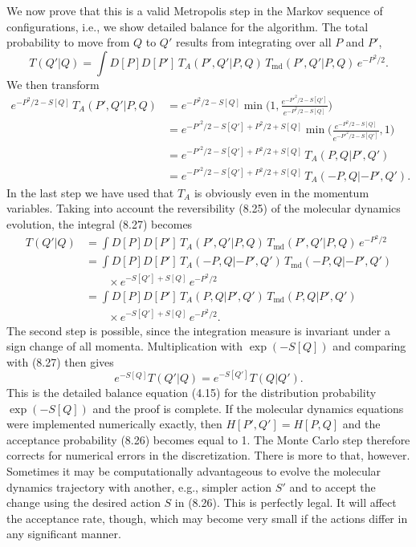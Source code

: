 We now prove that this is a valid Metropolis step in the Markov sequence of
configurations, i.e., we show detailed balance for the algorithm. The total
probability to move from $Q$ to $Q'$ results from integrating over all $P$ and
$P'$,
\begin{equation}
T(Q'|Q) = \int D[P]D[P']\,T_A(P',Q'|P,Q)\,T_{\mathrm{md}}(P',Q'|P,Q)\,e^{-P^2/2}.
\end{equation}
We then transform
\begin{equation}
\begin{split}
e^{-P^2/2-S[Q]}\,T_A(P',Q'|P,Q)
&= e^{-P^2/2-S[Q]}\min\!\Big(1,\frac{e^{-P'^2/2-S[Q']}}{e^{-P^2/2-S[Q]}}\Big)\\
&= e^{-P'^2/2-S[Q']+P^2/2+S[Q]}
   \min\!\Big(\frac{e^{-P^2/2-S[Q]}}{e^{-P'^2/2-S[Q']}},1\Big)\\
&= e^{-P'^2/2-S[Q']+P^2/2+S[Q]}\,T_A(P,Q|P',Q')\\
&= e^{-P'^2/2-S[Q']+P^2/2+S[Q]}\,T_A(-P,Q|-P',Q').
\end{split}
\end{equation}
In the last step we have used that $T_A$ is obviously even in the momentum
variables. Taking into account the reversibility (8.25) of the molecular
dynamics evolution, the integral (8.27) becomes
\begin{equation}
\begin{split}
T(Q'|Q) &= \int D[P]D[P']\,T_A(P',Q'|P,Q)\,T_{\mathrm{md}}(P',Q'|P,Q)\,e^{-P^2/2}\\
&= \int D[P]D[P']\,T_A(-P,Q|-P',Q')\,T_{\mathrm{md}}(-P,Q|-P',Q')\\
&\qquad \times e^{-S[Q']+S[Q]}\,e^{-P^2/2}\\
&= \int D[P]D[P']\,T_A(P,Q|P',Q')\,T_{\mathrm{md}}(P,Q|P',Q')\\
&\qquad \times e^{-S[Q']+S[Q]}\,e^{-P^2/2}.
\end{split}
\end{equation}
The second step is possible, since the integration measure is invariant under a
sign change of all momenta. Multiplication with $\exp(-S[Q])$ and comparing
with (8.27) then gives
\begin{equation}
e^{-S[Q]}T(Q'|Q) = e^{-S[Q']}T(Q|Q').
\end{equation}
This is the detailed balance equation (4.15) for the distribution probability
$\exp(-S[Q])$ and the proof is complete.
If the molecular dynamics equations were implemented numerically exactly, then
$H[P',Q'] = H[P,Q]$ and the acceptance probability (8.26) becomes equal to 1.
The Monte Carlo step therefore corrects for numerical errors in the
discretization. There is more to that, however. Sometimes it may be
computationally advantageous to evolve the molecular dynamics trajectory with
another, e.g., simpler action $S'$ and to accept the change using the desired
action $S$ in (8.26). This is perfectly legal. It will affect the acceptance
rate, though, which may become very small if the actions differ in any
significant manner.

